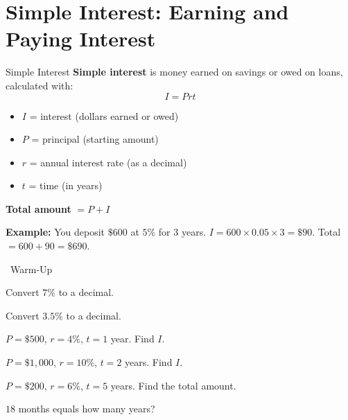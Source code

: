 \section{Simple Interest: Earning and Paying Interest}

\begin{quickReview}{Simple Interest}
\textbf{Simple interest} is money earned on savings or owed on loans, calculated with:
$$I = Prt$$

\begin{itemize}[leftmargin=*]
    \item $I$ = interest (dollars earned or owed)
    \item $P$ = principal (starting amount)
    \item $r$ = annual interest rate (as a decimal)
    \item $t$ = time (in years)
\end{itemize}

\textbf{Total amount} $= P + I$

\medskip
\textbf{Example:} You deposit $\$600$ at $5\%$ for $3$ years. $I = 600 \times 0.05 \times 3 = \$90$. Total $= 600 + 90 = \$690$.
\end{quickReview}

\begin{practiceBox}[funGreen]{\faSun~Warm-Up}


\begin{multicols}{2}
\prob Convert $7\%$ to a decimal. \answerBlank[3cm]

\prob Convert $3.5\%$ to a decimal. \answerBlank[3cm]

\prob $P = \$500$, $r = 4\%$, $t = 1$ year. Find $I$. \answerBlank[3cm]

\prob $P = \$1{,}000$, $r = 10\%$, $t = 2$ years. Find $I$. \answerBlank[3cm]

\prob $P = \$200$, $r = 6\%$, $t = 5$ years. Find the total amount. \answerBlank[3cm]

\prob $18$ months equals how many years? \answerBlank[3cm]
\end{multicols}
\end{practiceBox}

